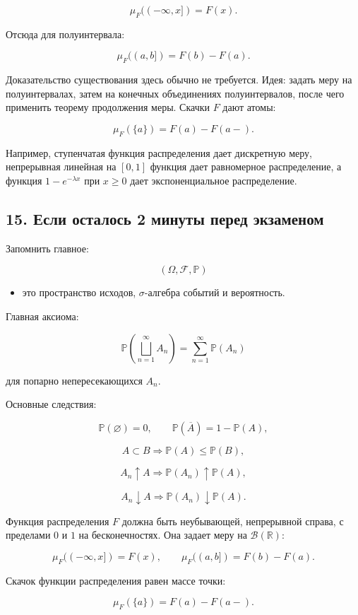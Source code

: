 \documentclass[
  11pt,
  a4paper,
]{article}
\providecommand{\tightlist}{%
  \setlength{\itemsep}{0pt}\setlength{\parskip}{0pt}}
\begin{document}
\[
\mu_F((-\infty,x])=F(x).
\]

Отсюда для полуинтервала:

\[
\mu_F((a,b])=F(b)-F(a).
\]

Доказательство существования здесь обычно не требуется. Идея: задать
меру на полуинтервалах, затем на конечных объединениях полуинтервалов,
после чего применить теорему продолжения меры. Скачки \(F\) дают атомы:

\[
\mu_F(\{a\})=F(a)-F(a-).
\]

Например, ступенчатая функция распределения дает дискретную меру,
непрерывная линейная на \([0,1]\) функция дает равномерное
распределение, а функция \(1-e^{-\lambda x}\) при \(x\ge0\) дает
экспоненциальное распределение.

\subsection{15. Если осталось 2 минуты перед
экзаменом}\label{ux435ux441ux43bux438-ux43eux441ux442ux430ux43bux43eux441ux44c-2-ux43cux438ux43dux443ux442ux44b-ux43fux435ux440ux435ux434-ux44dux43aux437ux430ux43cux435ux43dux43eux43c}

Запомнить главное:

\[
(\Omega,\mathcal F,\mathbb P)
\]

\begin{itemize}
\tightlist
\item
  это пространство исходов, \(\sigma\)-алгебра событий и вероятность.
\end{itemize}

Главная аксиома:

\[
\mathbb P\left(\bigsqcup_{n=1}^{\infty}A_n\right)
=
\sum_{n=1}^{\infty}\mathbb P(A_n)
\]

для попарно непересекающихся \(A_n\).

Основные следствия:

\[
\mathbb P(\varnothing)=0,\qquad
\mathbb P(\overline{A})=1-\mathbb P(A),
\]

\[
A\subset B\Rightarrow\mathbb P(A)\le\mathbb P(B),
\]

\[
A_n\uparrow A\Rightarrow\mathbb P(A_n)\uparrow\mathbb P(A),
\]

\[
A_n\downarrow A\Rightarrow\mathbb P(A_n)\downarrow\mathbb P(A).
\]

Функция распределения \(F\) должна быть неубывающей, непрерывной справа,
с пределами \(0\) и \(1\) на бесконечностях. Она задает меру на
\(\mathcal B(\mathbb R)\):

\[
\mu_F((-\infty,x])=F(x),
\qquad
\mu_F((a,b])=F(b)-F(a).
\]

Скачок функции распределения равен массе точки:

\[
\mu_F(\{a\})=F(a)-F(a-).
\]

\newpage
\end{document}

